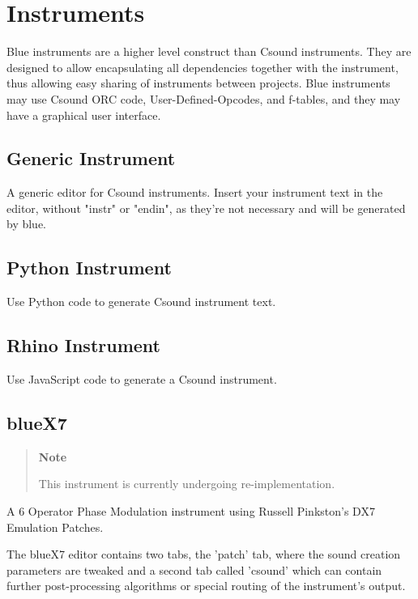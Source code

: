 \section{Instruments}\label{instruments}

Blue instruments are a higher level construct than Csound instruments.
They are designed to allow encapsulating all dependencies together with
the instrument, thus allowing easy sharing of instruments between
projects. Blue instruments may use Csound ORC code,
User-Defined-Opcodes, and f-tables, and they may have a graphical user
interface.

\subsection{Generic Instrument}\label{genericInstrument}

A generic editor for Csound instruments. Insert your instrument text in
the editor, without "instr" or "endin", as they're not necessary and
will be generated by blue.

\subsection{Python Instrument}\label{pythonInstrument}

Use Python code to generate Csound instrument text.

\subsection{Rhino Instrument}\label{rhinoInstrument}

Use JavaScript code to generate a Csound instrument.


\subsection{blueX7}\label{blueX7}

\begin{quote}
\textbf{Note}

This instrument is currently undergoing re-implementation.
\end{quote}

A 6 Operator Phase Modulation instrument using Russell Pinkston's DX7
Emulation Patches.

The blueX7 editor contains two tabs, the 'patch' tab, where the sound
creation parameters are tweaked and a second tab called 'csound' which
can contain further post-processing algorithms or special routing of the
instrument's output.

